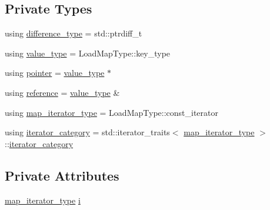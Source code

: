 \subsection*{Private Types}
\begin{DoxyCompactItemize}
\item 
using \hyperlink{classvt_1_1vrt_1_1collection_1_1balance_1_1_object_iterator_a97e592ab92b9cdf3156c10aacad7723c}{difference\+\_\+type} = std\+::ptrdiff\+\_\+t
\item 
using \hyperlink{classvt_1_1vrt_1_1collection_1_1balance_1_1_object_iterator_aae1089959ea6df7ad5a69e3c07eaa338}{value\+\_\+type} = Load\+Map\+Type\+::key\+\_\+type
\item 
using \hyperlink{classvt_1_1vrt_1_1collection_1_1balance_1_1_object_iterator_a404cd8d8df262392bc43bb9661bd5dec}{pointer} = \hyperlink{classvt_1_1vrt_1_1collection_1_1balance_1_1_object_iterator_aae1089959ea6df7ad5a69e3c07eaa338}{value\+\_\+type} $\ast$
\item 
using \hyperlink{classvt_1_1vrt_1_1collection_1_1balance_1_1_object_iterator_a921db19dfae04436602ae6014ec14e2b}{reference} = \hyperlink{classvt_1_1vrt_1_1collection_1_1balance_1_1_object_iterator_aae1089959ea6df7ad5a69e3c07eaa338}{value\+\_\+type} \&
\item 
using \hyperlink{classvt_1_1vrt_1_1collection_1_1balance_1_1_object_iterator_a9100746b4842b68f94f569a9e8e2cda0}{map\+\_\+iterator\+\_\+type} = Load\+Map\+Type\+::const\+\_\+iterator
\item 
using \hyperlink{classvt_1_1vrt_1_1collection_1_1balance_1_1_object_iterator_a8dd3383cf328b85a95a77501a34b252d}{iterator\+\_\+category} = std\+::iterator\+\_\+traits$<$ \hyperlink{classvt_1_1vrt_1_1collection_1_1balance_1_1_object_iterator_a9100746b4842b68f94f569a9e8e2cda0}{map\+\_\+iterator\+\_\+type} $>$\+::\hyperlink{classvt_1_1vrt_1_1collection_1_1balance_1_1_object_iterator_a8dd3383cf328b85a95a77501a34b252d}{iterator\+\_\+category}
\end{DoxyCompactItemize}
\subsection*{Private Attributes}
\begin{DoxyCompactItemize}
\item 
\hyperlink{classvt_1_1vrt_1_1collection_1_1balance_1_1_object_iterator_a9100746b4842b68f94f569a9e8e2cda0}{map\+\_\+iterator\+\_\+type} \hyperlink{classvt_1_1vrt_1_1collection_1_1balance_1_1_object_iterator_a9c8bdb9fdb75846e2e99fe0148c06b6b}{i}
\end{DoxyCompactItemize}



